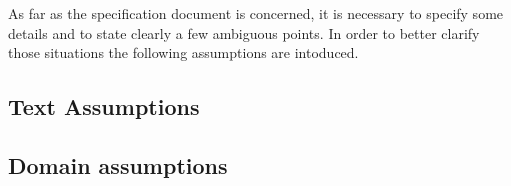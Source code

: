 As far as the specification document is concerned, it is necessary to specify some details and to state clearly a few ambiguous points. In order to better clarify those situations the following assumptions are intoduced.

\subsection{Text Assumptions}
\subsection{Domain assumptions}